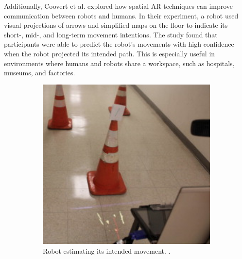 Additionally, Coovert et al. \cite{Coovert2014} explored how spatial AR techniques can improve communication between robots and humans. In their experiment, a robot used visual projections of arrows and simplified maps on the floor to indicate its short-, mid-, and long-term movement intentions. The study found that participants were able to predict the robot’s movements with high confidence when the robot projected its intended path. This is especially useful in environments where humans and robots share a workspace, such as hospitals, museums, and factories.

\begin{figure}[ht]
    \centering
    \begin{subfigure}[b]{0.4\textwidth}
        \centering
        \includegraphics[width=\textwidth]{ch2/figs/robot_nav2.png}
        \caption{Robot estimating its intended movement. \cite{Coovert2014}.}
        \label{fig:estimating_path}
    \end{subfigure}
    \hspace{0.05\textwidth} %
    \begin{subfigure}[b]{0.32\textwidth}
        \centering

\end{subfigure}
\end{figure}
